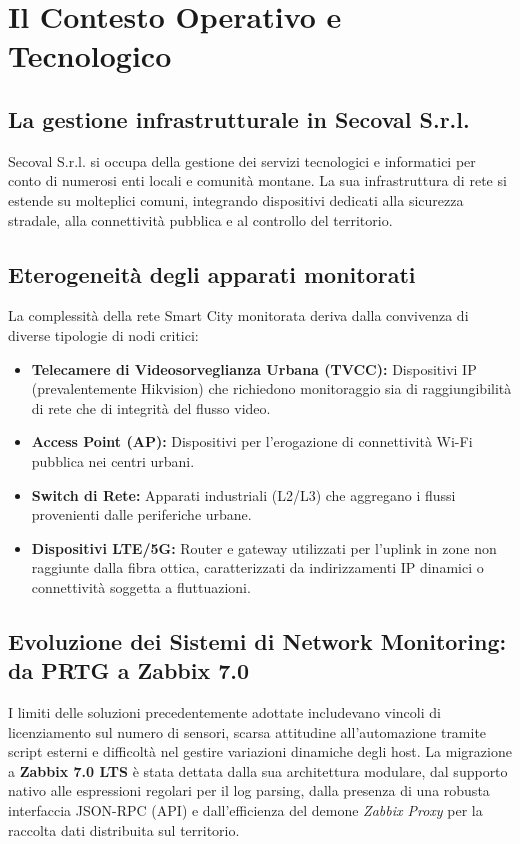 \documentclass[12pt, a4paper]{report}
\begin{document}
\clearpage

\chapter{Il Contesto Operativo e Tecnologico}
\section{La gestione infrastrutturale in Secoval S.r.l.}
Secoval S.r.l. si occupa della gestione dei servizi tecnologici e informatici per conto di numerosi enti locali e comunit\`a montane. La sua infrastruttura di rete si estende su molteplici comuni, integrando dispositivi dedicati alla sicurezza stradale, alla connettivit\`a pubblica e al controllo del territorio.

\section{Eterogeneit\`a degli apparati monitorati}
La complessit\`a della rete Smart City monitorata deriva dalla convivenza di diverse tipologie di nodi critici:
\begin{itemize}
    \item \textbf{Telecamere di Videosorveglianza Urbana (TVCC):} Dispositivi IP (prevalentemente Hikvision) che richiedono monitoraggio sia di raggiungibilit\`a di rete che di integrit\`a del flusso video.
    \item \textbf{Access Point (AP):} Dispositivi per l'erogazione di connettivit\`a Wi-Fi pubblica nei centri urbani.
    \item \textbf{Switch di Rete:} Apparati industriali (L2/L3) che aggregano i flussi provenienti dalle periferiche urbane.
    \item \textbf{Dispositivi LTE/5G:} Router e gateway utilizzati per l'uplink in zone non raggiunte dalla fibra ottica, caratterizzati da indirizzamenti IP dinamici o connettivit\`a soggetta a fluttuazioni.
\end{itemize}

\section{Evoluzione dei Sistemi di Network Monitoring: da PRTG a Zabbix 7.0}
I limiti delle soluzioni precedentemente adottate includevano vincoli di licenziamento sul numero di sensori, scarsa attitudine all'automazione tramite script esterni e difficolt\`a nel gestire variazioni dinamiche degli host. La migrazione a \textbf{Zabbix 7.0 LTS} \`e stata dettata dalla sua architettura modulare, dal supporto nativo alle espressioni regolari per il log parsing, dalla presenza di una robusta interfaccia JSON-RPC (API) e dall'efficienza del demone \textit{Zabbix Proxy} per la raccolta dati distribuita sul territorio.
\end{document}
